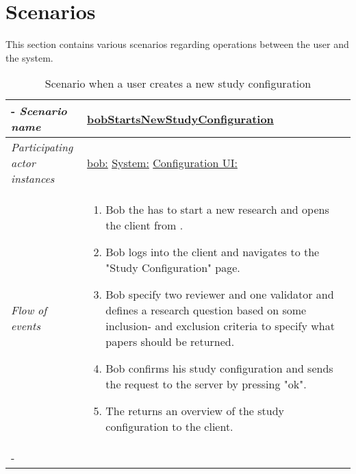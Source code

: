 \section{Scenarios}
This section contains various scenarios regarding operations between the user and the system.

%
%
\begin{table}[h!]
	\tabulinesep=1.5mm
	\begin{tabu} to 
		\tabucline[1.5pt]-
		\textit{Scenario name} & \underline{bobStartsNewStudyConfiguration} \\
		\hline
		\textit{Participating actor \newline instances} & \underline{bob:\researcher} \newline \underline{System:\system}
		\newline \underline{Configuration UI:\configUI} \\
		\hline
		\textit{Flow of events} &
		\vspace{-3mm}
		\begin{enumerate}[leftmargin=*,topsep=0pt,itemsep=-1ex]
			\item Bob the \researcher has to start a new research  and opens the client from \configUI. 
			\item Bob logs into the client and navigates to the "Study Configuration" page. 
			\item Bob specify two reviewer and one validator and defines a research question based on some inclusion- and exclusion criteria to specify what papers should be returned. 
			\item Bob confirms his study configuration and sends the request to the server by pressing "ok".
			\item The \system returns an overview of the study configuration to the client.
		\end{enumerate} \\
		\tabucline[1.5pt]-
	\end{tabu}
	\caption{Scenario when a user creates a new study configuration}
	\label{sc:bobStartsNewStudyConfiguration}
\end{table}


